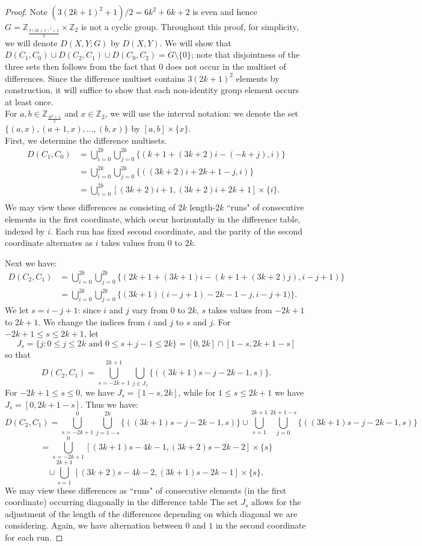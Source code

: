 \documentclass[10pt,a4paper]{amsart}
\begin{document}
\begin{proof}
Note $(3(2k+1)^2+1)/2=6k^2+6k+2$ is even and hence $G=\mathbb{Z}_{\frac{3(2k+1)^2+1}{2}}\times\mathbb{Z}_2$ is not a cyclic group.  
Throughout this proof, for simplicity, we will denote $D(X,Y; G)$ by $D(X,Y)$. We will show that $D(C_1,C_0) \cup D(C_2,C_1) \cup D(C_0,C_2)=G \setminus \{0\}$; note that disjointness of the three sets then follows from the fact that $0$ does not occur in the multiset of differences.  Since the difference multiset contains $3(2k+1)^2$ elements by construction, it will suffice to show that each non-identity group element occurs at least once.\\
For $a, b \in \mathbb{Z}_{\frac{3l^2+1}{2}}$ and $x \in \mathbb{Z}_2$, we will use the interval notation: we denote the set $\{(a,x), (a+1,x), \ldots, (b,x)\}$ by $[a,b]\times \{x\}$. \\
First, we determine the difference multisets. 
\begin{align*}
D  (C_1,C_0) &= \bigcup_{i=0}^{2k}\bigcup_{j=0}^{2k}\{(k+1+(3k+2)i-(-k+j),i)\}\\
&= \bigcup_{i=0}^{2k}\bigcup_{j=0}^{2k}\{((3k+2)i+2k+1-j,i)\}\\
&= \bigcup_{i=0}^{2k}[(3k+2)i+1,(3k+2)i+2k+1]\times \{i\}.\\
\end{align*}
We may view these differences as consisting of $2k$ length-$2k$ ``runs" of consecutive elements in the first coordinate, which occur horizontally in the difference table, indexed by $i$. Each run has fixed second coordinate, and the parity of the second coordinate alternates as $i$ takes values from $0$ to $2k$.

Next we have:
\begin{align*}
D(C_2,C_1) &= \bigcup_{i=0}^{2k}\bigcup_{j=0}^{2k}\{(2k+1+(3k+1)i-(k+1+(3k+2)j),i-j+1)\}\\
&= \bigcup_{i=0}^{2k}\bigcup_{j=0}^{2k}\{(3k+1)(i-j+1)-2k-1-j,i-j+1)\}.
\end{align*}
We let $s = i-j+1$: since $i$ and $j$ vary from $0$ to $2k$, $s$ takes values from  $-2k+1$ to $2k+1$.  We change the indices from $i$ and $j$ to $s$ and $j$.  For $-2k+1 \leq s \leq 2k+1$, let  $$J_s=\{j: 0 \leq j \leq 2k \mbox{ and } 0 \leq s+j-1 \leq 2k\}=[0,2k] \cap [1-s,2k+1-s]$$
so that
$$D  (C_2,C_1) = \bigcup_{s=-2k+1}^{2k+1}\bigcup_{j \in J_s} \{((3k+1)s-j-2k-1,s)\}.$$
For $-2k+1 \leq s \leq 0$, we have $J_s=[1-s,2k]$, while for $1 \leq s \leq 2k+1$ we have $J_s=[0,2k+1-s].$  Thus we have:
\[ D  (C_2,C_1) = \bigcup_{s=-2k+1}^{0}
\bigcup_{j = 1-s}^{2k} \{((3k+1)s-j-2k-1,s)\}
\cup\bigcup_{s=1}^{2k+1}\bigcup_{j =0}^{2k+1-s} 
\{((3k+1)s-j-2k-1,s)\}\]
\[= \bigcup_{s=-2k+1}^{0}
[(3k+1)s-4k-1,(3k+2)s-2k-2]\times \{s\}\]\[\cup\bigcup_{s=1}^{2k+1}
[(3k+2)s-4k-2,(3k+1)s-2k-1]\times \{s\}.\]
We may view these differences as ``runs" of consecutive elements (in the first coordinate) occurring diagonally in the difference table The set $J_s$ allows for the adjustment of the length of the differences depending on which diagonal we are considering. Again, we have alternation between $0$ and $1$ in the second coordinate for each run.


\end{proof}
\end{document}
